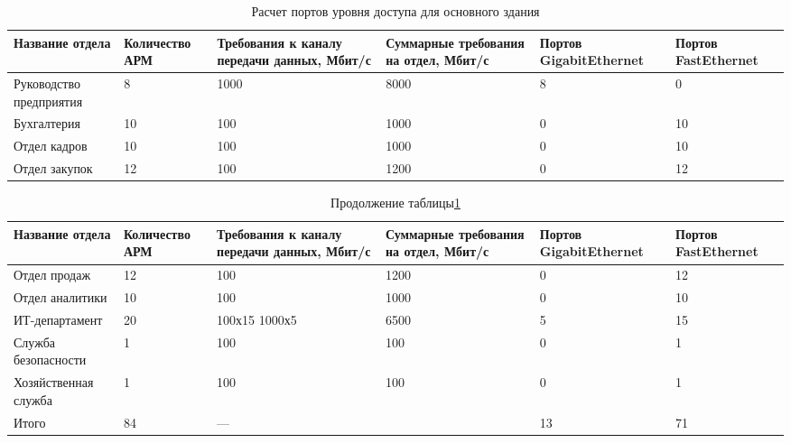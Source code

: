 \begin{table}[H]
    \centering
	\caption{Расчет портов уровня доступа для основного здания\label{table:dostup_ports_oz}}
    \small
	\begin{tabularx}{\textwidth}{|p{2.5cm}|X|X|X|p{2.5cm}|X|}
        \hline
		Название отдела&Количество АРМ&Требования к каналу передачи данных, Мбит/с&Суммарные требования на отдел, Мбит/с & Портов GigabitEthernet & Портов FastEthernet \\
        \hline
		Руководство предприятия         & 8       		&  	1000			&	8000  & 8 & 0	\\
		\hline
		Бухгалтерия						& 10         	&  	100				&	1000  & 0 & 10	\\
        \hline
		Отдел кадров					& 10         	&  	100				&	1000  & 0 & 10 \\
        \hline
		Отдел закупок					& 12         	&  	100				&	1200  & 0 & 12 \\
    \end{tabularx}
\end{table}

\begin{table}[H]
    \centering
	\caption{Продолжение таблицы\;\ref{table:dostup_ports_oz}}
    \small
	\begin{tabularx}{\textwidth}{|p{2.5cm}|X|X|X|p{2.5cm}|X|}
        \hline
		Название отдела&Количество АРМ&Требования к каналу передачи данных, Мбит/с&Суммарные требования на отдел, Мбит/с & Портов GigabitEthernet & Портов FastEthernet \\
        \hline
		Отдел продаж					& 12         	&  	100				&	1200  & 0 & 12 \\
        \hline
		Отдел аналитики					& 10         	&  	100				&	1000  & 0 & 10 \\
        \hline
		ИТ-департамент					& 20         	&  	100х15  1000х5	&	6500  & 5 & 15 \\
        \hline
		Служба безопасности				& 1				& 	100				&	100	  & 0 & 1 \\
		\hline
		Хозяйственная служба			& 1         	&  	100				&	100   & 0 & 1 \\
        \hline
		Итого							& 84	& \multicolumn{2}{X|}{---}			  &13& 71\\
		\hline
    \end{tabularx}
\end{table}


